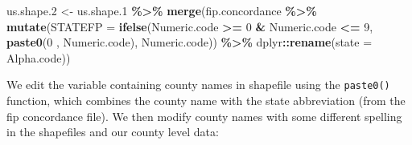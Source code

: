 \documentclass[
]{article}
\newenvironment{Shaded}{\begin{snugshade}}{\end{snugshade}}
\newcommand{\AttributeTok}[1]{\textcolor[rgb]{0.13,0.29,0.53}{#1}}
\newcommand{\DecValTok}[1]{\textcolor[rgb]{0.00,0.00,0.81}{#1}}
\newcommand{\FloatTok}[1]{\textcolor[rgb]{0.00,0.00,0.81}{#1}}
\newcommand{\FunctionTok}[1]{\textcolor[rgb]{0.13,0.29,0.53}{\textbf{#1}}}
\newcommand{\NormalTok}[1]{#1}
\newcommand{\OtherTok}[1]{\textcolor[rgb]{0.56,0.35,0.01}{#1}}
\newcommand{\SpecialCharTok}[1]{\textcolor[rgb]{0.81,0.36,0.00}{\textbf{#1}}}
\newcommand{\StringTok}[1]{\textcolor[rgb]{0.31,0.60,0.02}{#1}}
\begin{document}
\begin{Shaded}
\begin{Highlighting}[]
\NormalTok{us.shape}\FloatTok{.2} \OtherTok{\textless{}{-}}\NormalTok{ us.shape}\FloatTok{.1} \SpecialCharTok{\%\textgreater{}\%} 
  \FunctionTok{merge}\NormalTok{(fip.concordance }\SpecialCharTok{\%\textgreater{}\%}
          \FunctionTok{mutate}\NormalTok{(}\AttributeTok{STATEFP =}  \FunctionTok{ifelse}\NormalTok{(Numeric.code }\SpecialCharTok{\textgreater{}=} \DecValTok{0} \SpecialCharTok{\&}\NormalTok{ Numeric.code }\SpecialCharTok{\textless{}=} \DecValTok{9}\NormalTok{, }
                             \FunctionTok{paste0}\NormalTok{(}\DecValTok{0}\NormalTok{ , Numeric.code), Numeric.code)) }\SpecialCharTok{\%\textgreater{}\%}
\NormalTok{          dplyr}\SpecialCharTok{::}\FunctionTok{rename}\NormalTok{(}\AttributeTok{state =}\NormalTok{ Alpha.code))}
\end{Highlighting}
\end{Shaded}

We edit the variable containing county names in shapefile using the
\texttt{paste0()} function, which combines the county name with the
state abbreviation (from the fip concordance file). We then modify
county names with some different spelling in the shapefiles and our
county level data:

\vspace{6mm}

\begin{Shaded}
\end{Shaded}
\end{document}
